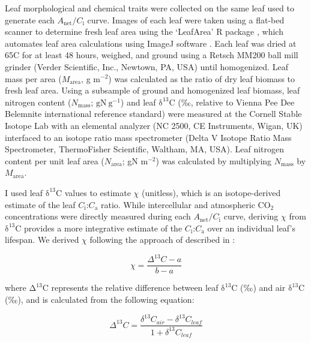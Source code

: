 Leaf morphological and chemical traits were collected on the same leaf used to generate each $A_\mathrm{net}/C_\mathrm{i}$ curve. Images of each leaf were taken using a flat-bed scanner to determine fresh leaf area using the ‘LeafArea’ R package , which automates leaf area calculations using ImageJ software . Each leaf was dried at 65\textdegree{}C for at least 48 hours, weighed, and ground using a Retsch MM200 ball mill grinder (Verder Scientific, Inc., Newtown, PA, USA) until homogenized. Leaf mass per area ($M_\mathrm{area}$, g m$^{-2}$) was calculated as the ratio of dry leaf biomass to fresh leaf area. Using a subsample of ground and homogenized leaf biomass, leaf nitrogen content ($N_\mathrm{mass}$; $\mathrm{gN\ g^{-1}}$) and leaf $\mathrm{\delta^{13}C}$ (‰, relative to Vienna Pee Dee Belemnite international reference standard) were measured at the Cornell Stable Isotope Lab with an elemental analyzer (NC 2500, CE Instruments, Wigan, UK) interfaced to an isotope ratio mass spectrometer (Delta V Isotope Ratio Mass Spectrometer, ThermoFisher Scientific, Waltham, MA, USA). Leaf nitrogen content per unit leaf area ($N_\mathrm{area}$; gN m$^{-2}$) was calculated by multiplying $N_\mathrm{mass}$ by $M_\mathrm{area}$.

I used leaf $\mathrm{\delta^{13}}$C values to estimate $\chi$ (unitless), which is an isotope-derived estimate of the leaf $C_\mathrm{i}$:$C_\mathrm{a}$ ratio. While intercellular and atmospheric CO$_2$ concentrations were directly measured during each $A_\mathrm{net}/C_\mathrm{i}$ curve, deriving $\chi$ from $\mathrm{\delta^{13}}$C provides a more integrative estimate of the $C_\mathrm{i}$:$C_\mathrm{a}$ over an individual leaf’s lifespan. We derived $\chi$ following the approach of  described in :

\begin{equation} \label{eq_2.1}
    \chi= \frac{\Delta^{13}C-a}{b-a}
\end{equation}

\noindent where $\mathrm{\Delta^{13}}$C represents the relative difference between leaf $\mathrm{\delta^{13}}$C (‰) and air $\mathrm{\delta^{13}}$C (‰), and is calculated from the following equation:

\begin{equation} \label{eq_2.2}
    \Delta^{13}C= \frac{\delta^{13}C_{air}-\delta^{13}C_{leaf}}{1+\delta^{13}C_{leaf}}
\end{equation}
    
